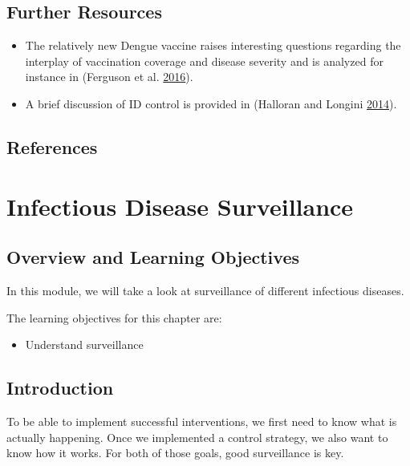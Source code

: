 \documentclass[]{book}
\providecommand{\tightlist}{%
  \setlength{\itemsep}{0pt}\setlength{\parskip}{0pt}}
\theoremstyle{definition}
\theoremstyle{definition}
\theoremstyle{definition}
\theoremstyle{remark}
\begin{document}
\section{Further Resources}\label{further-resources-8}

\begin{itemize}
\tightlist
\item
  The relatively new Dengue vaccine raises interesting questions
  regarding the interplay of vaccination coverage and disease severity
  and is analyzed for instance in (Ferguson et al.
  \protect\hyperlink{ref-ferguson16}{2016}).
\item
  A brief discussion of ID control is provided in (Halloran and Longini
  \protect\hyperlink{ref-halloran14}{2014}).
\end{itemize}

\section{References}\label{references-9}

\chapter{Infectious Disease
Surveillance}\label{infectious-disease-surveillance}

\section{Overview and Learning
Objectives}\label{overview-and-learning-objectives-9}

In this module, we will take a look at surveillance of different
infectious diseases.

The learning objectives for this chapter are:

\begin{itemize}
\tightlist
\item
  Understand surveillance
\end{itemize}

\section{Introduction}\label{introduction-9}

To be able to implement successful interventions, we first need to know
what is actually happening. Once we implemented a control strategy, we
also want to know how it works. For both of those goals, good
surveillance is key.
\end{document}
